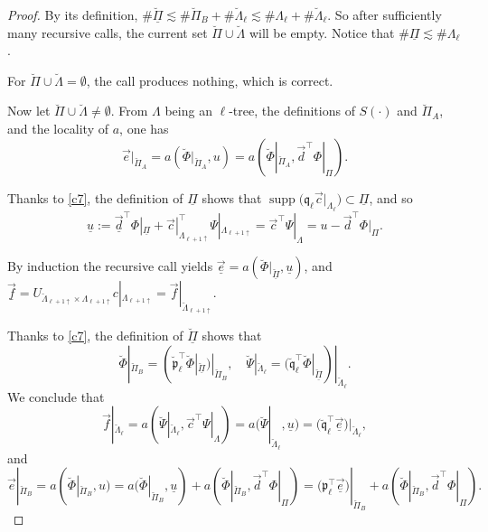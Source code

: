 \documentclass{amsart}
\theoremstyle{definition}
\theoremstyle{remark}
\numberwithin{equation}{section}
\DeclareMathOperator{\supp}{supp}
\newcommand{\1}{\mathbb 1}
\begin{document}
 \begin{proof}
By its definition, $\# \breve{\underline{\Pi}} \lesssim \#\breve{\Pi}_B +\# \breve{\Lambda}_\ell \lesssim \# \Lambda_\ell+\# \breve{\Lambda}_\ell$. So after sufficiently many recursive calls, the current set  $\breve{\Pi}  \cup \breve{\Lambda}$ will be empty.
Notice that 
 $\# \underline{\Pi}  \lesssim \#\Lambda_\ell$.

 For $\breve{\Pi}  \cup \breve{\Lambda}= \emptyset$, the call produces nothing, which is correct.
  

Now let  $\breve{\Pi}  \cup \breve{\Lambda} \neq \emptyset$.
From $\Lambda$ being an $\ell$-tree, the definitions of $S(\cdot)$ and $\breve{\Pi}_A$, and the locality of $a$, one has
 $$
 \vec{e}|_{\breve{\Pi}_A}=a(\breve{\Phi}|_{\breve{\Pi}_A},u)=a(\breve{\Phi}|_{\breve{\Pi}_A},\vec{d}^\top\Phi|_{\Pi}).
 $$
 
 Thanks to \eqref{c7}, the definition of $\underline{\Pi}$ shows that $\supp \big(\mathfrak{q}_\ell \vec{c}|_{\Lambda_{\ell}}\big) \subset \underline{\Pi}$, and so
  $$
 \underline{u}:=\underline{\vec{d}}^\top\Phi|_{\underline{\Pi}}+\vec{c}|_{\Lambda_{\ell+1\uparrow}}^\top \Psi|_{\Lambda_{\ell+1\uparrow}} =\vec{c}^\top \Psi|_{\Lambda}=u-\vec{d}^\top \Phi|_{\Pi}.
 $$
 
By induction the recursive call  yields
 $\underline{\vec{e}}=a(\breve{\Phi}|_{\breve{\underline{\Pi}}}, \underline{u})$, and
 $\underline{\vec{f}}=U_{\breve{\Lambda}_{\ell+1 \uparrow} \times \Lambda_{\ell+1 \uparrow}} c|_{\Lambda_{\ell+1 \uparrow}}=\vec{f}|_{\breve{\Lambda}_{\ell+1 \uparrow}}$.

Thanks to \eqref{c7}, the definition of $\breve{\underline{\Pi}}$ shows that
$$
 \breve{\Phi}|_{\breve{\Pi}_B}=(\breve{\mathfrak{p}}_{\ell} ^\top \breve{\Phi}|_{\underline{\breve{\Pi}}})|_{\breve{\Pi}_B},\quad \breve{\Psi}|_{\breve{\Lambda}_\ell}=(\mathfrak{\breve{q}}_\ell^\top \breve{\Phi}|_{\underline{\breve{\Pi}}})|_{\breve{\Lambda}_\ell}.
 $$
We conclude that 
 $$
  \vec{f}|_{\breve{\Lambda}_\ell}= a(\breve{\Psi}|_{\breve{\Lambda}_\ell}, \vec{c}^\top \Psi|_{\Lambda}) =a(\breve{\Psi}|_{\breve{\Lambda}_\ell}, \underline{u})=
   \big(\mathfrak{\breve{q}}_\ell^\top \underline{\vec{e}}\big)|_{\breve{\Lambda}_\ell},
 $$ 
and
$$
 \vec{e}|_{\breve{\Pi}_B}=  a(\breve{\Phi}|_{\breve{\Pi}_B}, u)= a(\breve{\Phi}|_{\breve{\Pi}_B}, \underline{u})+a(\breve{\Phi}|_{\breve{\Pi}_B},\vec{d}^\top\Phi|_{\Pi})=   \big(\mathfrak{p}_{\ell} ^\top \underline{\vec{e}}\big)|_{\breve{\Pi}_B}+a(\breve{\Phi}|_{\breve{\Pi}_B},\vec{d}^\top\Phi|_{\Pi}).
$$



\end{proof}
\end{document}
